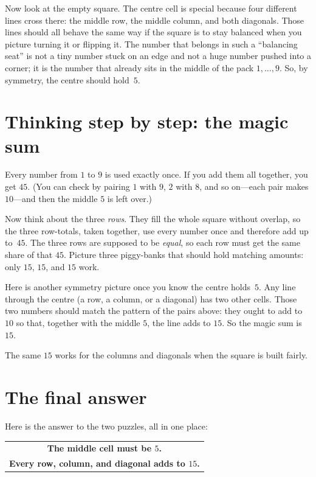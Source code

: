 Now look at the empty square. The centre cell is special because four different
lines cross there: the middle row, the middle column, and both diagonals. Those
lines should all behave the same way if the square is to stay balanced when you
picture turning it or flipping it. The number that belongs in such a ``balancing
seat'' is not a tiny number stuck on an edge and not a huge number pushed into
a corner; it is the number that already sits in the middle of the pack
\(1,\ldots,9\). So, by symmetry, the centre should hold~\(5\).

\section{Thinking step by step: the magic sum}
Every number from \(1\) to \(9\) is used exactly once. If you add them all
together, you get \(45\). (You can check by pairing \(1\) with \(9\), \(2\) with
\(8\), and so on---each pair makes \(10\)---and then the middle \(5\) is left
over.)

Now think about the three \emph{rows}. They fill the whole square without overlap,
so the three row-totals, taken together, use every number once and therefore add
up to~\(45\). The three rows are supposed to be \emph{equal}, so each row must
get the same share of that \(45\). Picture three piggy-banks that should hold
matching amounts: only \(15\), \(15\), and \(15\) work.

Here is another symmetry picture once you know the centre holds~\(5\). Any line
through the centre (a row, a column, or a diagonal) has two other cells. Those
two numbers should match the pattern of the pairs above: they ought to add to
\(10\) so that, together with the middle \(5\), the line adds to \(15\). So the
magic sum is \(15\).

The same \(15\) works for the columns and diagonals when the square is built
fairly.

\section{The final answer}
Here is the answer to the two puzzles, all in one place:

\begin{center}
\renewcommand{\arraystretch}{1.3}
\begin{tabular}{|c|}
\hline
\textbf{The middle cell must be \(5\).}\\[0.35em]
\textbf{Every row, column, and diagonal adds to \(15\).}\\
\hline
\end{tabular}
\end{center}

